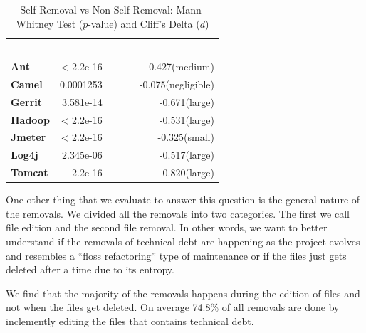 \begin{table}[tb]
	\begin{center}
		\caption{Self-Removal vs Non Self-Removal: Mann-Whitney Test ($p$-value) and Cliff's Delta ($d$)}
		\label{tbl:statistic}
		\begin{tabular}{l| rrr}
			\toprule
			\textbf{\thead{Project}} & \textbf{\thead{$p$-value}}&~~~ & \textbf{\thead{$d$}}\\ 
			\midrule
			\textbf{Ant   }   &  < 2.2e-16& ~~~  &  -0.427(medium)  \\  
			\textbf{Camel }   &  0.0001253& ~~~ &  -0.075(negligible)  \\  
			\textbf{Gerrit}   &  3.581e-14& ~~~ &  -0.671(large)  \\  
			\textbf{Hadoop}   &  < 2.2e-16& ~~~ &  -0.531(large)  \\  
			\textbf{Jmeter}   &  < 2.2e-16& ~~~ &  -0.325(small)  \\  
			\textbf{Log4j}   &  2.345e-06 & ~~~ &  -0.517(large)  \\  
			\textbf{Tomcat}   &  2.2e-16  & ~~~ &  -0.820(large) \\  
			\bottomrule
		\end{tabular}
	\end{center}    
\end{table}






One other thing that we evaluate to answer this question is the general nature of the removals. We divided all the removals into two categories. The first we call file edition and the second file removal. In other words, we want to better understand if the removals of technical debt are happening as the project evolves and resembles a ``floss refactoring'' type of maintenance or if the files just gets deleted after a time due to its entropy. 

We find that the majority of the removals happens during the edition of files and not when the files get deleted. On average 74.8\% of all removals are done by inclemently editing the files that contains technical debt.







